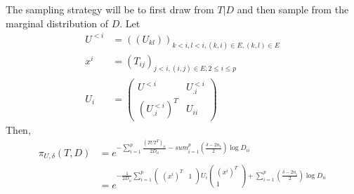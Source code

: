 \documentclass[12pt, leqno]{article}
\begin{document}
The sampling strategy will be to first draw from $T|D$ and then sample
from the marginal distribution of $D$. Let
\begin{align*}
U^{<i} &= ((U_{kl}))_{k<i,l<i,(k,i)\in E, (k,l) \in E} \\
x^i &= (T_{ij})_{j<i,(i,j) \in E,2 \leq i \leq p} \\
U_i &= \begin{pmatrix} U^{<i} & U_{.i}^{<i} \\ (U_{.i}^{<i})^T &
  U_{ii} \end{pmatrix}
\end{align*}
Then, 
\begin{align*}
\pi_{U,\delta}(T,D) 
&= e^{-\sum_{i=1}^p \frac{(TUT^T)_{ii}}{2D_{ii}}-sum_{i=1}^p
  (\frac{\delta-2n_i}{2})\log D_{ii}} \\
&= e^{-\frac{1}{2D_{ii}} \sum_{i=1}^p \begin{pmatrix} (x^i)^T &
    1\end{pmatrix} U_i \begin{pmatrix} (x^i)^T \\ 1\end{pmatrix} +
  \sum_{i=1}^p (\frac{\delta-2n_i}{2}) \log D_{ii}}
\end{align*}
\end{document}
